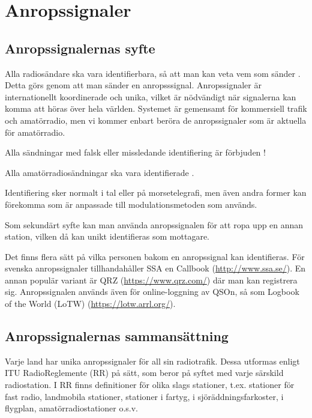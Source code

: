 \section{Anropssignaler}

\subsection{Anropssignalernas syfte}

Alla radiosändare ska vara identifierbara, så att man kan veta vem
som sänder \cite[§19.1]{ITU-RR}. Detta görs genom att man sänder en
anropsssignal. Anropssignaler är internationellt koordinerade och unika, vilket är nödvändigt när signalerna kan komma att höras över hela världen. Systemet är gemensamt för kommersiell trafik och amatörradio, men vi kommer enbart beröra de anropssignaler som är aktuella för amatörradio.

Alla sändningar med falsk eller missledande identifiering är förbjuden \cite[§19.2]{ITU-RR}!

Alla amatörradiosändningar ska vara identifierade \cite[§19.4, §19.5]{ITU-RR}.

Identifiering sker normalt i tal eller på morsetelegrafi, men även andra former kan
förekomma som är anpassade till modulationsmetoden som används.

Som sekundärt syfte kan man använda anropssignalen för att ropa upp en annan station, vilken då kan unikt identifieras som mottagare.

Det finns flera sätt på vilka personen bakom en anropssignal kan identifieras. För svenska anropssignaler tillhandahåller SSA en Callbook (\url{http://www.ssa.se/}). En annan populär variant är QRZ (\url{https://www.qrz.com/}) där man kan registrera sig.
Anropssignalen används även för online-loggning av QSOn, så som Logbook of the World (LoTW) (\url{https://lotw.arrl.org/}).

\subsection{Anropssignalernas sammansättning}

Varje land har unika anropssignaler för all sin radiotrafik.
Dessa utformas enligt ITU RadioReglemente (RR) \cite[§19]{ITU-RR} på sätt,
som beror på syftet med varje särskild radiostation. I RR finns
definitioner för olika slags stationer, t.ex. stationer för fast
radio, landmobila stationer, stationer i fartyg, i
sjöräddningsfarkoster, i flygplan, amatörradiostationer o.s.v.


